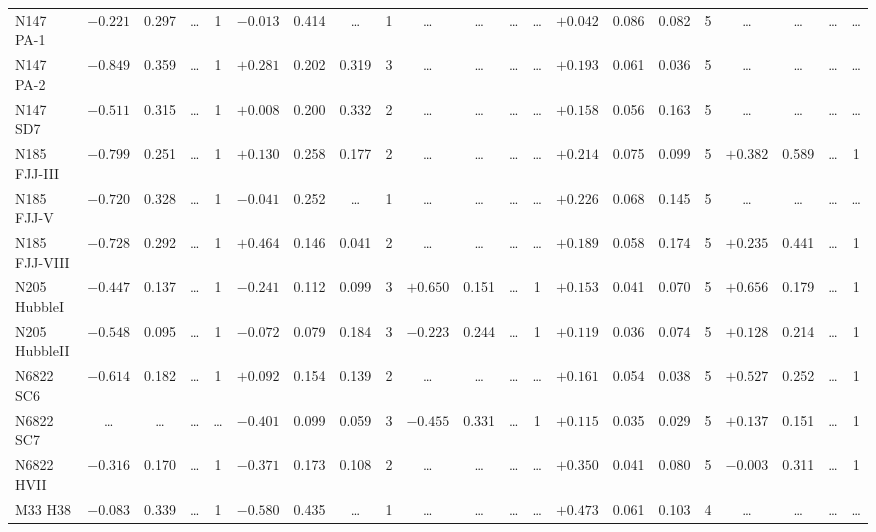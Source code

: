\documentclass{aa}
\begin{document}
\begin{appendix}
\begin{table*}
\begin{adjustbox}{width=1\textwidth}
{\begin{tabular}{l cccccccccccccccccccc}
N147 PA-1     & $-0.221$ & 0.297 & \ldots & 1 & $-0.013$ & 0.414 & \ldots & 1 & \ldots & \ldots & \ldots & \ldots & $+0.042$ & 0.086 & 0.082 & 5 & \ldots & \ldots & \ldots & \ldots \\
N147 PA-2     & $-0.849$ & 0.359 & \ldots & 1 & $+0.281$ & 0.202 & 0.319 & 3 & \ldots & \ldots & \ldots & \ldots & $+0.193$ & 0.061 & 0.036 & 5 & \ldots & \ldots & \ldots & \ldots \\
N147 SD7      & $-0.511$ & 0.315 & \ldots & 1 & $+0.008$ & 0.200 & 0.332 & 2 & \ldots & \ldots & \ldots & \ldots & $+0.158$ & 0.056 & 0.163 & 5 & \ldots & \ldots & \ldots & \ldots \\
N185 FJJ-III  & $-0.799$ & 0.251 & \ldots & 1 & $+0.130$ & 0.258 & 0.177 & 2 & \ldots & \ldots & \ldots & \ldots & $+0.214$ & 0.075 & 0.099 & 5 & $+0.382$ & 0.589 & \ldots & 1 \\
N185 FJJ-V    & $-0.720$ & 0.328 & \ldots & 1 & $-0.041$ & 0.252 & \ldots & 1 & \ldots & \ldots & \ldots & \ldots & $+0.226$ & 0.068 & 0.145 & 5 & \ldots & \ldots & \ldots & \ldots \\
N185 FJJ-VIII & $-0.728$ & 0.292 & \ldots & 1 & $+0.464$ & 0.146 & 0.041 & 2 & \ldots & \ldots & \ldots & \ldots & $+0.189$ & 0.058 & 0.174 & 5 & $+0.235$ & 0.441 & \ldots & 1 \\
N205 HubbleI  & $-0.447$ & 0.137 & \ldots & 1 & $-0.241$ & 0.112 & 0.099 & 3 & $+0.650$ & 0.151 & \ldots & 1 & $+0.153$ & 0.041 & 0.070 & 5 & $+0.656$ & 0.179 & \ldots & 1 \\
N205 HubbleII & $-0.548$ & 0.095 & \ldots & 1 & $-0.072$ & 0.079 & 0.184 & 3 & $-0.223$ & 0.244 & \ldots & 1 & $+0.119$ & 0.036 & 0.074 & 5 & $+0.128$ & 0.214 & \ldots & 1 \\
N6822 SC6     & $-0.614$ & 0.182 & \ldots & 1 & $+0.092$ & 0.154 & 0.139 & 2 & \ldots & \ldots & \ldots & \ldots & $+0.161$ & 0.054 & 0.038 & 5 & $+0.527$ & 0.252 & \ldots & 1 \\
N6822 SC7     & \ldots & \ldots & \ldots & \ldots & $-0.401$ & 0.099 & 0.059 & 3 & $-0.455$ & 0.331 & \ldots & 1 & $+0.115$ & 0.035 & 0.029 & 5 & $+0.137$ & 0.151 & \ldots & 1 \\
N6822 HVII    & $-0.316$ & 0.170 & \ldots & 1 & $-0.371$ & 0.173 & 0.108 & 2 & \ldots & \ldots & \ldots & \ldots & $+0.350$ & 0.041 & 0.080 & 5 & $-0.003$ & 0.311 & \ldots & 1 \\
M33 H38       & $-0.083$ & 0.339 & \ldots & 1 & $-0.580$ & 0.435 & \ldots & 1 & \ldots & \ldots & \ldots & \ldots & $+0.473$ & 0.061 & 0.103 & 4 & \ldots & \ldots & \ldots & \ldots \\

\end{tabular}}
\end{adjustbox}
\end{table*}
\end{appendix}
\end{document}
